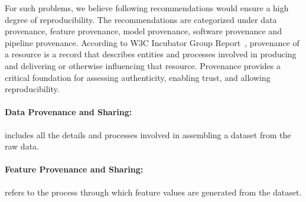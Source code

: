For such problems, we believe following recommendations would ensure a high degree of reproducibility. 
The recommendations are categorized under data provenance, feature provenance, model provenance, 
software provenance and pipeline provenance. According to W3C Incubator Group Report~\cite{w3c}, 
provenance of a resource is a record that describes entities and processes involved in producing 
and delivering or otherwise influencing that resource. Provenance provides a critical foundation 
for assessing authenticity, enabling trust, and allowing reproducibility. 

\paragraph{Data Provenance and Sharing:}
includes all the details and processes involved in assembling a dataset from the raw data.
\begin{itemize}
\end{itemize}

\paragraph{Feature Provenance and Sharing:}
refers to the process through which feature values are generated from the dataset.
\begin{itemize}
\end{itemize}

